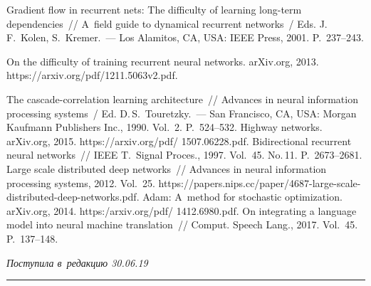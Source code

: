 \begin{multicols}{2}
{{\begin{thebibliography}{99}
   Gradient flow in 
recurrent nets: The difficulty of learning long-term dependencies~// A~field guide to 
dynamical recurrent networks~/ Eds. J.\,F.~Kolen, S.~Kremer.~--- Los Alamitos, CA, USA: 
IEEE Press, 2001. P.~237--243.

   On the difficulty of training recurrent 
neural networks. arXiv.org, 2013. {\sf https://arxiv.org/pdf/1211.5063v2.pdf}.

   The cascade-correlation learning architecture~// 
Advances in neural information processing systems~/ Ed. D.\,S.~Touretzky.~--- 
San Francisco, CA, USA: Morgan Kaufmann Publishers Inc., 1990. Vol.~2. P.~524--532.
   Highway networks. 
arXiv.org, 2015. {\sf https://arxiv.org/pdf/ 1507.06228.pdf}.
   Bidirectional recurrent neural networks~// IEEE 
T.~Signal Proces., 1997. Vol.~45. No.\,11. P.~2673--2681.
   Large scale distributed 
deep networks~// Advances in neural information processing systems, 
2012. Vol.~25. {\sf https://papers.nips.cc/paper/4687-large-scale-distributed-deep-networks.pdf}.
   Adam: A~method for stochastic optimization. 
arXiv.org, 2014. {\sf https:/arxiv.org/pdf/ 1412.6980.pdf}.
   On integrating a language 
model into neural machine translation~// Comput. Speech Lang., 2017. Vol.~45. 
P.~137--148.

 \end{thebibliography}

 }
 }

\end{multicols}

\vspace*{-6pt}

\hfill{\small\textit{Поступила в~редакцию 30.06.19}}

\vspace*{8pt}




\hrule

\vspace*{2pt}

